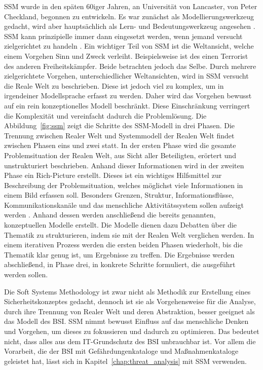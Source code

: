 \documentclass[11pt,a4paper]{report}
\begin{document}
SSM wurde in den späten 60iger Jahren, an Universität von Lancaster, von Peter Checkland, begonnen zu entwickeln. Es war zunächst als Modellierungswerkzeug gedacht, wird aber hauptsächlich als Lern- und Bedeutungswerkzeug angesehen \cite{bobwill}. SSM kann prinzipielle immer dann eingesetzt werden, wenn jemand versucht zielgerichtet zu handeln \cite{checkland1}. Ein wichtiger Teil von SSM ist die Weltansicht, welche einem Vorgehen Sinn und Zweck verleiht. Beispielsweise ist des einen Terrorist des anderen Freiheitskämpfer. Beide betrachten jedoch das Selbe. Durch mehrere zielgerichtete Vorgehen, unterschiedlicher Weltansichten, wird in SSM versucht die Reale Welt zu beschrieben. Diese ist jedoch viel zu komplex, um in irgendeiner Modellsprache erfasst zu werden. Daher wird das Vorgehen bewusst auf ein rein konzeptionelles Modell beschränkt. Diese Einschränkung verringert die Komplexität und vereinfacht dadurch die Problemlösung. Die Abbildung~\ref{fig:ssm} zeigt die Schritte des SSM-Modell in drei Phasen. Die Trennung zwischen Realer Welt und Systemmodell der Realen Welt findet zwischen Phasen eins und zwei statt. In der ersten Phase wird die gesamte Problemsituation der Realen Welt, aus Sicht aller Beteiligten, erörtert und unstrukturiert beschrieben. Anhand dieser Informationen wird in der zweiten Phase ein Rich-Picture erstellt. Dieses ist ein wichtiges Hilfsmittel zur Beschreibung der Problemsituation, welches möglichst viele Informationen in einem Bild erfassen soll. Besonders Grenzen, Struktur, Informationsflüsse, Kommunikationskanäle und das menschliche Aktivitätssystem sollen aufzeigt werden \cite{ssmger}. Anhand dessen werden anschließend die bereits genannten, konzeptuellen Modelle erstellt. Die Modelle dienen dazu Debatten über die Thematik zu strukturieren, indem sie mit der Realen Welt verglichen werden. In einem iterativen Prozess werden die ersten beiden Phasen wiederholt, bis die Thematik klar genug ist, um Ergebnisse zu treffen. Die Ergebnisse werden abschließend, in Phase drei, in konkrete Schritte formuliert, die ausgeführt werden sollen. 

Die Soft Systems Methodology ist zwar nicht als Methodik zur Erstellung eines Sicherheitskonzeptes gedacht, dennoch ist sie als Vorgehensweise für die Analyse, durch ihre Trennung von Realer Welt und deren Abstraktion, besser geeignet als das Modell des BSI. SSM nimmt bewusst Einfluss auf das menschliche Denken und Vorgehen, um dieses zu fokussieren und dadurch zu optimieren. Das bedeutet nicht, dass alles aus dem IT-Grundschutz des BSI unbrauchbar ist. Vor allem die Vorarbeit, die der BSI mit Gefährdungenkataloge und Maßnahmenkataloge geleistet hat, lässt sich in Kapitel~\ref{chap:threat_analysis} mit SSM verwenden.
\end{document}
